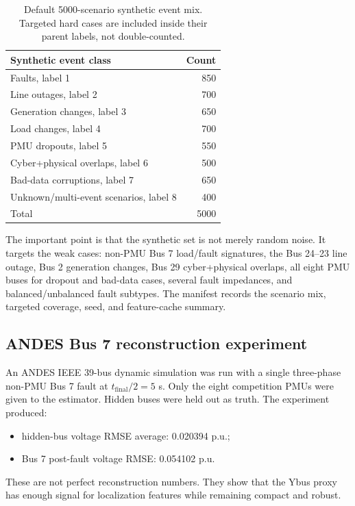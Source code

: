 \documentclass[11pt]{article}
\begin{document}
\begin{table}[H]
\centering
\caption{Default 5000-scenario synthetic event mix. Targeted hard cases are
included inside their parent labels, not double-counted.}
\begin{tabular}{lr}
\toprule
Synthetic event class & Count \\
\midrule
Faults, label 1 & 850 \\
Line outages, label 2 & 700 \\
Generation changes, label 3 & 650 \\
Load changes, label 4 & 700 \\
PMU dropouts, label 5 & 550 \\
Cyber+physical overlaps, label 6 & 500 \\
Bad-data corruptions, label 7 & 650 \\
Unknown/multi-event scenarios, label 8 & 400 \\
\midrule
Total & 5000 \\
\bottomrule
\end{tabular}
\label{tab:synthetic_counts}
\end{table}

The important point is that the synthetic set is not merely random noise. It
targets the weak cases: non-PMU Bus 7 load/fault signatures, the Bus 24--23
line outage, Bus 2 generation changes, Bus 29 cyber+physical overlaps, all
eight PMU buses for dropout and bad-data cases, several fault impedances, and
balanced/unbalanced fault subtypes. The manifest records the scenario mix,
targeted coverage, seed, and feature-cache summary.

\subsection{ANDES Bus 7 reconstruction experiment}

An ANDES IEEE 39-bus dynamic simulation was run with a single three-phase
non-PMU Bus 7 fault at $t_{\mathrm{final}}/2=5$ s. Only the eight competition
PMUs were given to the estimator. Hidden buses were held out as truth. The
experiment produced:

\begin{itemize}
  \item hidden-bus voltage RMSE average: 0.020394 p.u.;
  \item Bus 7 post-fault voltage RMSE: 0.054102 p.u.
\end{itemize}

These are not perfect reconstruction numbers. They show that the Ybus proxy has
enough signal for localization features while remaining compact and robust.
\end{document}

